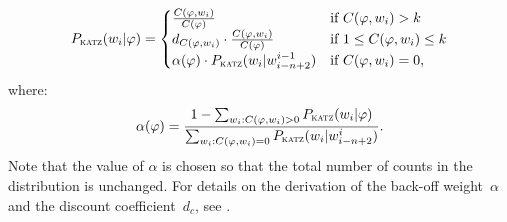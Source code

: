 	\begin{equation}
		P_{\textsc{katz}}(w_{i}|\varphi)=
		\begin{cases}
			\frac{C(\varphi, w_{i})}{C(\varphi)}& \text{if } C(\varphi, w_{i}) > k\\
			d_{C(\varphi, w_{i})}\cdot \frac{C(\varphi, w_{i})}{C(\varphi)}& \text{if } 1 \leq C(\varphi, w_{i}) \leq k\\
			\alpha(\varphi)\cdot P_{\textsc{katz}}(w_{i}|w_{i-n+2}^{i-1})& \text{if } C(\varphi, w_{i})=0,
		\end{cases}
	\end{equation}
	where:
	\begin{equation}
		\alpha(\varphi)=\frac{1-\sum_{w_{i}:C(\varphi, w_{i})>0}P_{\textsc{katz}}(w_{i}|\varphi)}{\sum_{w_{i}:C(\varphi, w_{i})=0}P_{\textsc{katz}}(w_{i}|w_{i-n+2}^{i})}.
	\end{equation}
        Note that the value of $\alpha$ is chosen so that the total number of counts in the distribution is unchanged. For details on the derivation of the back-off weight~$\alpha$ and the discount coefficient~$d_{c}$, see \cite{chen1996empirical}.
